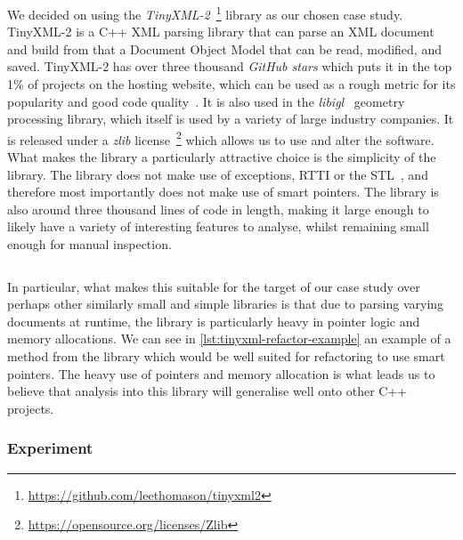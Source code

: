 \documentclass{mpaper}
\begin{document}
    We decided on using the \emph{TinyXML-2}~\footnote{\url{https://github.com/leethomason/tinyxml2}} library as our chosen case study.
    TinyXML-2 is a C++ XML parsing library that can parse an XML document and build from that a Document Object Model that can be read, modified, and saved.
    TinyXML-2 has over three thousand \emph{GitHub stars} which puts it in the top 1\% of projects on the hosting website, which can be used as a rough metric for its popularity and good code quality~\cite{Sanatinia2016}.
    It is also used in the \emph{libigl}~\cite{Libigl} geometry processing library,  which itself is used by a variety of large industry companies.
    It is released under a \emph{zlib} license~\footnote{\url{https://opensource.org/licenses/Zlib}} which allows us to use and alter the software.
    What makes the library a particularly attractive choice is the simplicity of the library.
    The library does not make use of exceptions, RTTI or the STL~\cite{C++17}, and therefore most importantly does not make use of smart pointers. 
    The library is also around three thousand lines of code in length, making it large enough to likely have a variety of interesting features to analyse, whilst remaining small enough for manual inspection.
    
    \begin{listing}
        \inputminted{cpp}{code/tinyxml2-example.cpp}
        \caption{Example of a method in the TinyXML-2 library which could be refactored to use smart pointers as it returns an owning pointer to a newly created object.}
        \label{lst:tinyxml-refactor-example}
    \end{listing}
    
    In particular, what makes this suitable for the target of our case study over perhaps other similarly small and simple libraries is that due to parsing varying documents at runtime, the library is particularly heavy in pointer logic and memory allocations.
    We can see in \autoref{lst:tinyxml-refactor-example} an example of a method from the library which would be well suited for refactoring to use smart pointers.
    The heavy use of pointers and memory allocation is what leads us to believe that analysis into this library will generalise well onto other C++ projects.
    
    \subsubsection{Experiment}
    
\end{document}
